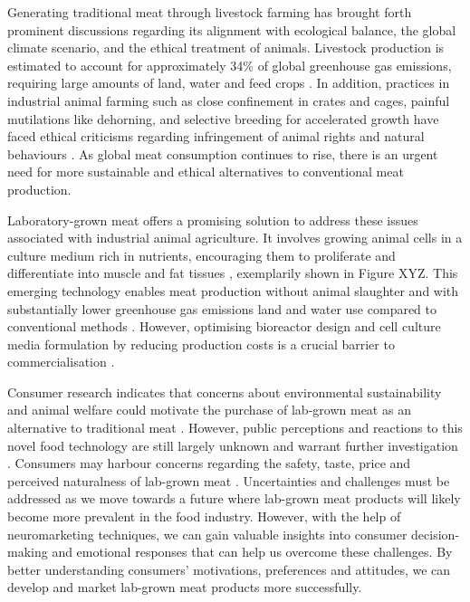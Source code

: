 \documentclass[10pt]{article}
\begin{document}
\begin{sloppypar}
  Generating traditional meat through livestock farming has brought forth prominent discussions regarding its alignment with ecological balance, the global climate scenario, and the ethical treatment of animals. Livestock production is estimated to account for approximately 34\% of global greenhouse gas emissions, requiring large amounts of land, water and feed crops \citep{tuomisto_environmental_2011}. In addition, practices in industrial animal farming such as close confinement in crates and cages, painful mutilations like dehorning, and selective breeding for accelerated growth have faced ethical criticisms regarding infringement of animal rights and natural behaviours \citep{stephens_bringing_2018}. As global meat consumption continues to rise, there is an urgent need for more sustainable and ethical alternatives to conventional meat production.



  Laboratory-grown meat offers a promising solution to address these issues associated with industrial animal agriculture. It involves growing animal cells in a culture medium rich in nutrients, encouraging them to proliferate and differentiate into muscle and fat tissues \citep{datar_possibilities_2010}, exemplarily shown in Figure XYZ. This emerging technology enables meat production without animal slaughter and with substantially lower greenhouse gas emissions land and water use compared to conventional methods \citep{tuomisto_environmental_2011}. However, optimising bioreactor design and cell culture media formulation by reducing production costs is a crucial barrier to commercialisation \citep{specht_opportunities_2018}.

  Consumer research indicates that concerns about environmental sustainability and animal welfare could motivate the purchase of lab-grown meat as an alternative to traditional meat \citep{circus_exploring_2018}. However, public perceptions and reactions to this novel food technology are still largely unknown and warrant further investigation \citep{verbeke_would_2015}. Consumers may harbour concerns regarding the safety, taste, price and perceived naturalness of lab-grown meat \citep{bryant_consumer_2018}. Uncertainties and challenges must be addressed as we move towards a future where lab-grown meat products will likely become more prevalent in the food industry. However, with the help of neuromarketing techniques, we can gain valuable insights into consumer decision-making and emotional responses that can help us overcome these challenges. By better understanding consumers’ motivations, preferences and attitudes, we can develop and market lab-grown meat products more successfully.


\end{sloppypar}
\end{document}
